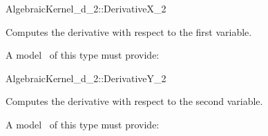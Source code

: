 \begin{ccRefConcept}{AlgebraicKernel_d_2::DerivativeX_2}

\ccDefinition
Computes the derivative with respect to the first variable.


A model \ccVar\ of this type must provide:

{}

\end{ccRefConcept}
\begin{ccRefConcept}{AlgebraicKernel_d_2::DerivativeY_2}

\ccDefinition
Computes the derivative with respect to the second variable.


A model \ccVar\ of this type must provide:

{}

\end{ccRefConcept}
